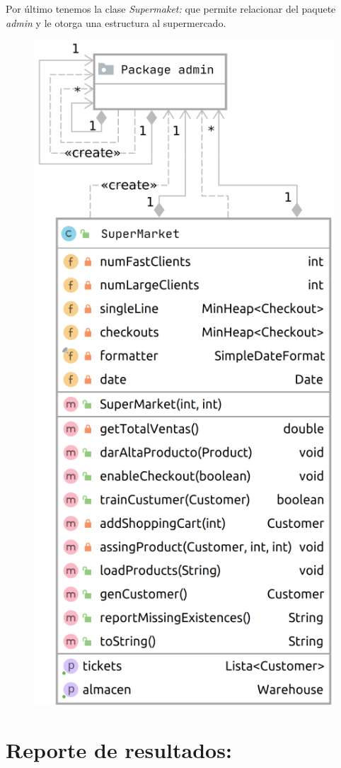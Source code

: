 \documentclass[letterpaper,11pt]{article}
\begin{document}
\newpage

Por último tenemos la clase \textit{Supermaket: } que permite relacionar del paquete \textit{admin} y le otorga una estructura al supermercado.
\begin{figure}[htb]
	\centering
	\includegraphics[scale=.39]{supermarket_diagram.png}
\end{figure}
\section*{Reporte de resultados:}
\end{document}
